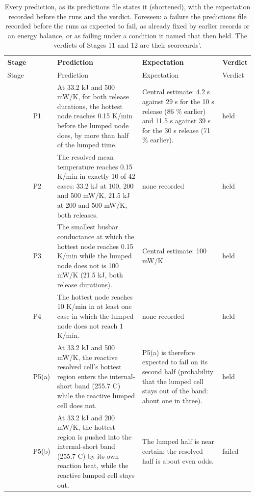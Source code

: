 {\sloppy\footnotesize
\begin{longtable}{>{\raggedright\arraybackslash}p{}>{\raggedright\arraybackslash}p{}>{\raggedright\arraybackslash}p{}>{\raggedright\arraybackslash}p{}>{\raggedright\arraybackslash}p{}}
\caption{Every prediction, as its predictions file states it (shortened), with the expectation recorded before the runs and the verdict. Foreseen: a failure the predictions file recorded before the runs as expected to fail, as already fixed by earlier records or an energy balance, or as failing under a condition it named that then held. The verdicts of Stages 11 and 12 are their scorecards'.}\label{tab:s-predictions}\\
\toprule
Stage & & Prediction & Expectation & Verdict \\
\midrule
\endfirsthead
\toprule
Stage & & Prediction & Expectation & Verdict \\
\midrule
\endhead
1 & P1 & At 33.2 kJ and 500 mW/K, for both release durations, the hottest node reaches 0.15 K/min before the lumped node does, by more than half of the lumped time. & Central estimate: 4.2 s against 29 s for the 10 s release (86 \% earlier) and 11.5 s against 39 s for the 30 s release (71 \% earlier). & held \\
1 & P2 & The resolved mean temperature reaches 0.15 K/min in exactly 10 of 42 cases: 33.2 kJ at 100, 200 and 500 mW/K, 21.5 kJ at 200 and 500 mW/K, both releases. & none recorded & held \\
1 & P3 & The smallest busbar conductance at which the hottest node reaches 0.15 K/min while the lumped node does not is 100 mW/K (21.5 kJ, both release durations). & Central estimate: 100 mW/K. & held \\
1 & P4 & The hottest node reaches 10 K/min in at least one case in which the lumped node does not reach 1 K/min. & none recorded & held \\
2 & P5(a) & At 33.2 kJ and 500 mW/K, the reactive resolved cell's hottest region enters the internal-short band (255.7 C) while the reactive lumped cell does not. & P5(a) is therefore expected to fail on its second half (probability that the lumped cell stays out of the band: about one in three). & held \\
2 & P5(b) & At 33.2 kJ and 200 mW/K, the hottest region is pushed into the internal-short band (255.7 C) by its own reaction heat, while the reactive lumped cell stays out. & The lumped half is near certain; the resolved half is about even odds. & failed \\

\end{longtable}}

